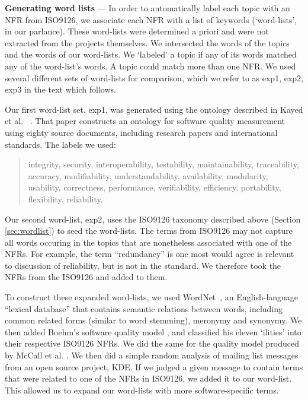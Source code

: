 \documentclass[]{sig-alternate}
\begin{document}
\noindent\textbf{Generating word lists} --- In order to automatically label each topic with an NFR from ISO9126, we associate each NFR with a list
of keywords (`word-lists', in our parlance). These word-lists were determined a priori and were not extracted from the projects themselves.
We intersected the words of the topics and the words of our word-lists.
We `labeled' a topic if any of its words matched any of the word-list's words.
A topic could match more than one NFR.
We used several different sets of word-lists for comparison, which we refer to as \textsf{exp1, exp2, exp3} in the text which follows. 

Our first word-list set, \textsf{exp1}, was generated using the ontology described in Kayed et al.~\cite{5072519} .
That paper constructs an ontology for software quality measurement using eighty source documents, including research papers and international standards. 
The labels we used:
\begin{quotation}
\small \noindent \textsf{
integrity, security,
interoperability, testability, maintainability, traceability,
accuracy, modifiability, understandability, availability, modularity,
usability, correctness, performance, verifiability, efficiency,
portability, flexibility, reliability.
}
\end{quotation}

Our second word-list, \textsf{exp2}, uses the ISO9126 taxonomy described above (Section \ref{sec:wordlist}) to seed the word-lists.
The terms from ISO9126 may not capture all words occuring in the topics that are nonetheless associated with one of the NFRs. 
For example, the term ``redundancy'' is one most would agree is relevant to discussion of reliability, but is not in the standard. 
We therefore took the NFRs from the ISO9126 and added to them.

To construct these expanded word-lists, we used WordNet~\cite{Fellbaum1998}, an English-language ``lexical database'' that contains semantic relations between words, including common related forms (similar to word stemming), meronymy and synonymy. 
We then added Boehm's software quality model \cite{Boehm+:1976:ICSE}, and classified his eleven `ilities' into their respective ISO9126 NFRs. 
We did the same for the quality model produced by McCall et al. \cite{mccall1977}. 
We then did a simple random analysis of mailing list messages from an open source project, KDE. If we judged a given message to contain terms that were related to one of the NFRs in ISO9126, we added it to our word-list. This allowed us to expand our word-lists with more software-specific terms.
\end{document}
